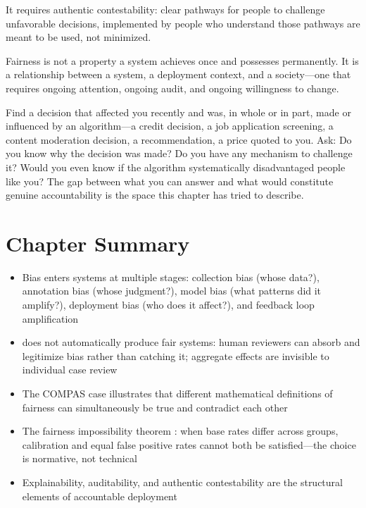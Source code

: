 It requires authentic contestability: clear pathways for people to challenge unfavorable decisions, implemented by people who understand those pathways are meant to be used, not minimized.

\begin{keyconcept}
Fairness is not a property a system achieves once and possesses permanently. It is a relationship between a system, a deployment context, and a society---one that requires ongoing attention, ongoing audit, and ongoing willingness to change.
\end{keyconcept}

\begin{trythis}
Find a decision that affected you recently and was, in whole or in part, made or influenced by an algorithm---a credit decision, a job application screening, a content moderation decision, a recommendation, a price quoted to you. Ask: Do you know why the decision was made? Do you have any mechanism to challenge it? Would you even know if the algorithm systematically disadvantaged people like you? The gap between what you can answer and what would constitute genuine accountability is the space this chapter has tried to describe.
\end{trythis}

\section*{Chapter Summary}

\begin{keyconcept}
\begin{itemize}
  \item Bias enters \ai systems at multiple stages: collection bias (whose data?), annotation bias (whose judgment?), model bias (what patterns did it amplify?), deployment bias (who does it affect?), and feedback loop amplification
  \item \hitl does not automatically produce fair systems: human reviewers can absorb and legitimize bias rather than catching it; aggregate effects are invisible to individual case review
  \item The COMPAS case illustrates that different mathematical definitions of fairness can simultaneously be true and contradict each other
  \item The fairness impossibility theorem \autocite{chouldechova2017fair}: when base rates differ across groups, calibration and equal false positive rates cannot both be satisfied---the choice is normative, not technical
  \item Explainability, auditability, and authentic contestability are the structural elements of accountable \ai deployment
\end{itemize}
\end{keyconcept}

